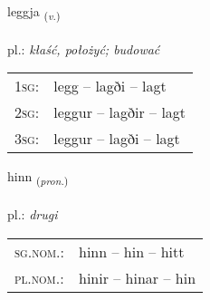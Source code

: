 \documentclass[frontgrid, backgrid]{flacards}\usepackage[]{graphicx}\usepackage[]{xcolor}
\begin{document}
{leggja \small{\textsubscript{(\textit{v.})}} \\[1ex] %
\textphonetic{[lɛca]} \\
pl.: \emph{kłaść, położyć; budować} \\  [2ex]
\renewcommand*{\arraystretch}{0.8}
\begin{tabular}{p{1cm}l}
\textsc{1sg}: & legg -- lagði -- lagt \\ 
\textsc{2sg}: & leggur -- lagðir -- lagt \\ 
\textsc{3sg}: & leggur -- lagði -- lagt \\ 
\end{tabular}
}

\renewcommand{\flhead}{\vskip5pt \fboxsep=0pt {\small\bfseries\footnotesize Fornafn | zaimek}}
\renewcommand{\fcfoot}{\vskip5pt \fboxsep=0pt \hspace{2pt}{\small\bfseries\footnotesize 1K}}

\renewcommand{\blhead}{\vskip5pt {\small\bfseries\footnotesize Fornafn | zaimek }}
\renewcommand{\bcfoot}{\vskip5pt \hspace{2pt}{\small\bfseries\footnotesize 1K}}


{hinn \small{\textsubscript{(\textit{pron.})}} \\[1ex] %
\textphonetic{[hɪn]} \\
pl.: \emph{drugi} \\  [2ex]
\renewcommand*{\arraystretch}{0.8}
\begin{tabular}{ll}
\textsc{sg.nom.}: & hinn  --  hin -- hitt \\ 
\textsc{pl.nom.}: & hinir -- hinar -- hin
\end{tabular}
}

\renewcommand{\flhead}{\vskip5pt \fboxsep=0pt {\small\bfseries\footnotesize Nafnorð | rzeczownik}}
\renewcommand{\fcfoot}{\vskip5pt \fboxsep=0pt \hspace{2pt}{\small\bfseries\footnotesize 1K}}

\renewcommand{\blhead}{\vskip5pt {\small\bfseries\footnotesize Nafnorð | rzeczownik }}
\renewcommand{\bcfoot}{\vskip5pt \hspace{2pt}{\small\bfseries\footnotesize 1K}}
\end{document}
